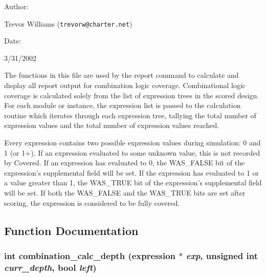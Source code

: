 \begin{Desc}
\item[Author: ]\par
Trevor Williams ({\tt trevorw@charter.net}) \end{Desc}
\begin{Desc}
\item[Date: ]\par
3/31/2002

 The functions in this file are used by the report command to calculate and display all  report output for combination logic coverage. Combinational logic coverage is calculated solely from the list of expression trees in the scored design. For each module or instance, the expression list is passed to the calculation routine which iterates through each expression tree, tallying the total number of expression values and the total number of expression values reached.

 Every expression contains two possible expression values during simulation: 0 and 1 (or 1+). If an expression evaluated to some unknown value, this is not recorded by Covered. If an expression has evaluated to 0, the WAS\_\-FALSE bit of the expression's supplemental field will be set. If the expression has evaluated to 1 or a value greater than 1, the WAS\_\-TRUE bit of the expression's supplemental field will be set. If both the WAS\_\-FALSE and the WAS\_\-TRUE bits are set after scoring, the expression is considered to be fully covered.\end{Desc}


\subsection{Function Documentation}
\subsubsection{\setlength{\rightskip}{0pt plus 5cm}int combination\_\-calc\_\-depth ({\bf expression} $\ast$ {\em exp}, unsigned int {\em curr\_\-depth}, {\bf bool} {\em left})}\label{comb_8c_a5}


